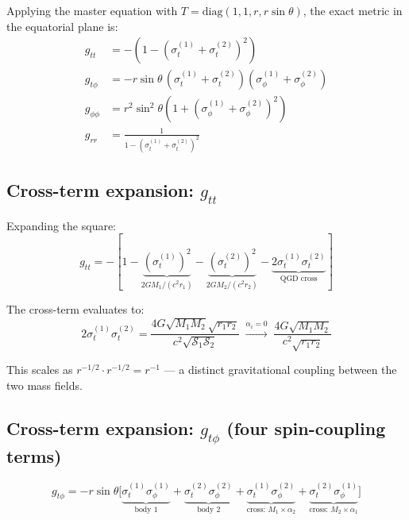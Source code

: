 \documentclass[11pt,a4paper]{article}
\theoremstyle{plain}
\theoremstyle{definition}
\theoremstyle{remark}
\newcommand{\sig}[2]{\sigma_{#1}^{(#2)}}
\begin{document}
Applying the master equation with $T = \mathrm{diag}(1,1,r,r\sin\theta)$, the exact metric in the equatorial plane is:
\begin{align}
  g_{tt} &= -\left(1 - (\sig{t}{1} + \sig{t}{2})^2\right)
  \label{eq:gtt_2} \\[4pt]
  g_{t\phi} &= -r\sin\theta\,(\sig{t}{1} + \sig{t}{2})(\sig{\phi}{1} + \sig{\phi}{2})
  \label{eq:gtphi_2} \\[4pt]
  g_{\phi\phi} &= r^2\sin^2\theta\left(1 + (\sig{\phi}{1} + \sig{\phi}{2})^2\right)
  \label{eq:gphiphi_2} \\[4pt]
  g_{rr} &= \frac{1}{1 - (\sig{t}{1} + \sig{t}{2})^2}
  \label{eq:grr_2}
\end{align}

\subsection{Cross-term expansion: $g_{tt}$}

Expanding the square:
\begin{equation}
  \boxed{g_{tt} = -\left[1 - \underbrace{(\sig{t}{1})^2}_{2GM_1/(c^2r_1)} - \underbrace{(\sig{t}{2})^2}_{2GM_2/(c^2r_2)} - \underbrace{2\sig{t}{1}\sig{t}{2}}_{\text{QGD cross}}\right]}
  \label{eq:gtt_expanded}
\end{equation}

The cross-term evaluates to:
\begin{equation}
  2\sig{t}{1}\sig{t}{2} = \frac{4G\sqrt{M_1M_2}\sqrt{r_1r_2}}{c^2\sqrt{\mathcal{S}_1\mathcal{S}_2}} \;\xrightarrow{\alpha_i=0}\; \frac{4G\sqrt{M_1M_2}}{c^2\sqrt{r_1r_2}}
  \label{eq:gtt_cross}
\end{equation}

This scales as $r^{-1/2}\cdot r^{-1/2} = r^{-1}$ --- a distinct gravitational coupling between the two mass fields.

\subsection{Cross-term expansion: $g_{t\phi}$ (four spin-coupling terms)}

\begin{equation}
  g_{t\phi} = -r\sin\theta\Big[\underbrace{\sig{t}{1}\sig{\phi}{1}}_{\text{body 1}} + \underbrace{\sig{t}{2}\sig{\phi}{2}}_{\text{body 2}} + \underbrace{\sig{t}{1}\sig{\phi}{2}}_{\text{cross: }M_1\times\alpha_2} + \underbrace{\sig{t}{2}\sig{\phi}{1}}_{\text{cross: }M_2\times\alpha_1}\Big]
  \label{eq:gtphi_expanded}
\end{equation}
\end{document}
